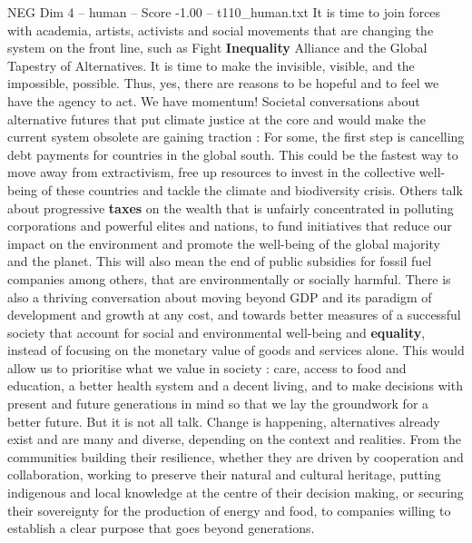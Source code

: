 \begin{textsample}{NEG Dim 4 – human – Score -1.00 – t110\_human.txt}
It is time to join forces with academia, artists, activists and social movements that are changing the system on the front line, such as Fight \textbf{Inequality} Alliance and the Global Tapestry of Alternatives.
It is time to make the invisible, visible, and the impossible, possible.
Thus, yes, there are reasons to be hopeful and to feel we have the agency to act.
We have momentum!
Societal conversations about alternative futures that put climate justice at the core and would make the current system obsolete are gaining traction : For some, the first step is cancelling debt payments for countries in the global south.
This could be the fastest way to move away from extractivism, free up resources to invest in the collective well-being of these countries and tackle the climate and biodiversity crisis.
Others talk about progressive \textbf{taxes} on the wealth that is unfairly concentrated in polluting corporations and powerful elites and nations, to fund initiatives that reduce our impact on the environment and promote the well-being of the global majority and the planet.
This will also mean the end of public subsidies for fossil fuel companies among others, that are environmentally or socially harmful.
There is also a thriving conversation about moving beyond GDP and its paradigm of development and growth at any cost, and towards better measures of a successful society that account for social and environmental well-being and \textbf{equality}, instead of focusing on the monetary value of goods and services alone.
This would allow us to prioritise what we value in society : care, access to food and education, a better health system and a decent living, and to make decisions with present and future generations in mind so that we lay the groundwork for a better future.
But it is not all talk.
Change is happening, alternatives already exist and are many and diverse, depending on the context and realities.
From the communities building their resilience, whether they are driven by cooperation and collaboration, working to preserve their natural and cultural heritage, putting indigenous and local knowledge at the centre of their decision making, or securing their sovereignty for the production of energy and food, to companies willing to establish a clear purpose that goes beyond generations.

\end{textsample}
